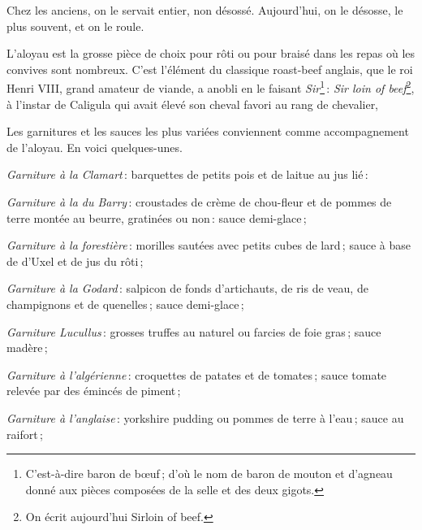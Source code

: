 Chez les anciens, on le servait entier, non désossé. Aujourd'hui, on le désosse,
le plus souvent, et on le roule.

L'aloyau est la grosse pièce de choix pour rôti ou pour braisé dans les repas
où les convives sont nombreux. C'est l'élément du classique roast-beef anglais,
que le roi Henri VIII, grand amateur de viande, a anobli en le faisant
\textit{Sir}\footnote{C'est-à-dire baron de bœuf ; d'où le nom de baron de
mouton et d'agneau donné aux pièces composées de la selle et des deux
gigots.} : \textit{Sir loin of beef}\footnote{On écrit aujourd’hui Sirloin of
beef.}, à l'instar de Caligula qui avait élevé son cheval favori au rang de
chevalier,

Les garnitures et les sauces les plus variées conviennent comme accompagnement
de l'aloyau. En voici quelques-unes.

\medskip

\textit{Garniture à la Clamart} : barquettes de petits pois et de laitue au jus
lié :

\medskip

\textit{Garniture à la du Barry} : croustades de crème de chou-fleur et de
pommes de terre montée au beurre, gratinées ou non : sauce demi-glace ;

\medskip

\textit{Garniture à la forestière} : morilles sautées avec petits cubes de
lard ; sauce à base de d'Uxel et de jus du rôti ;

\medskip

\textit{Garniture à la Godard} : salpicon de fonds d’artichauts, de ris de
veau, de champignons et de quenelles ; sauce demi-glace ;

\medskip

\textit{Garniture Lucullus} : grosses truffes au naturel ou farcies de foie
gras ; sauce madère ;

\medskip

\textit{Garniture à l'algérienne} : croquettes de patates et de tomates ; sauce tomate
relevée par des émincés de piment ;

\medskip

\textit{Garniture à l'anglaise} : yorkshire pudding ou pommes de terre
à l'eau ; sauce au raifort ;

\medskip

